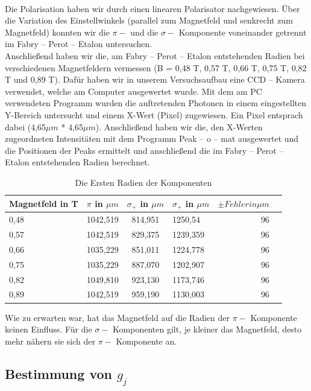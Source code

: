 \documentclass[10pt,a4paper]{article}
\begin{document}
\\
Die Polarisation haben wir durch einen linearen Polarisator nachgewiesen. Über die Variation des Einstellwinkels (parallel zum Magnetfeld und senkrecht zum Magnetfeld) konnten wir die $\pi - $  und die $\sigma  - $ Komponente voneinander getrennt im Fabry – Perot – Etalon untersuchen. 
\\
Anschließend haben wir die, am Fabry – Perot – Etalon entstehenden Radien bei verschiedenen Magnetfeldern vermessen (B = 0,48 T, 0,57 T,  0,66 T,  0,75 T, 0,82 T und 0,89 T). Dafür haben wir in unserem Versuchsaufbau eine CCD – Kamera verwendet, welche am Computer ausgewertet wurde. Mit dem am PC verwendeten Programm wurden die auftretenden Photonen in einem eingestellten Y-Bereich untersucht und einem X-Wert (Pixel) zugewiesen. Ein Pixel entsprach dabei (4,65$\mu m$  * 4,65$\mu m$). Anschließend haben wir die, den X-Werten zugeordneten Intensitäten mit dem Programm Peak – o – mat ausgewertet und die Positionen der Peaks ermittelt und anschließend die im Fabry – Perot – Etalon entstehenden Radien berechnet.

\begin{table}[h!]
	\centering
	\begin{tabular}{|l|r|c|lrp{16cm}}\hline
		Magnetfeld in T & $\pi $ in $\mu m$  & $\sigma_{+}$ in $\mu m$ & $\sigma_{+}$ in $\mu m$ & $\pm Fehler in $$\mu m $\\\hline
		0,48 & 1042,519 & 814,951 & 1250,54 & 96	\\
		0,57 & 1042,519 & 829,375 &1239,359 & 96	\\
		0,66 & 1035,229 & 851,011 &1224,778 & 96	\\
		0,75 & 1035,229 & 887,070 &1202,907 & 96 \\
		0,82 & 1049,810 & 923,130 &1173,746 & 96	\\
		0,89 & 1042,519 & 959,190 &1130,003 & 96 \\\hline
		
	\end{tabular}
	\caption{Die Ersten Radien der Komponenten}
	\label{spektrum2}
\end{table}


Wie zu erwarten war, hat das Magnetfeld auf die Radien der $\pi - $ Komponente keinen Einfluss. Für die $\sigma - $ Komponenten gilt, je kleiner das Magnetfeld, desto mehr nähern sie sich der $\pi - $ Komponente an.



\subsection{Bestimmung von $g_j$}
\end{document}
